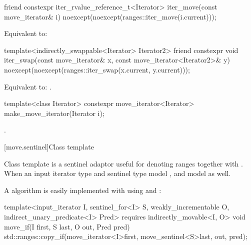 %
\begin{itemdecl}
friend constexpr iter_rvalue_reference_t<Iterator>
  iter_move(const move_iterator& i)
    noexcept(noexcept(ranges::iter_move(i.current)));
\end{itemdecl}

\begin{itemdescr}
\pnum
\effects
Equivalent to: 
\end{itemdescr}

%
\begin{itemdecl}
template<indirectly_swappable<Iterator> Iterator2>
  friend constexpr void
    iter_swap(const move_iterator& x, const move_iterator<Iterator2>& y)
      noexcept(noexcept(ranges::iter_swap(x.current, y.current)));
\end{itemdecl}

\begin{itemdescr}
\pnum
\effects
Equivalent to: .
\end{itemdescr}

%
\begin{itemdecl}
template<class Iterator>
constexpr move_iterator<Iterator> make_move_iterator(Iterator i);
\end{itemdecl}

\begin{itemdescr}
\pnum
\returns
{}.
\end{itemdescr}

[move.sentinel]{Class template }

\pnum
Class template  is a sentinel adaptor useful for denoting
ranges together with . When an input iterator type
 and sentinel type  model ,
 and  model
 as well.

\pnum
\begin{example}
A  algorithm is easily implemented with
 using  and :

\begin{codeblock}
template<input_iterator I, sentinel_for<I> S, weakly_incrementable O,
         indirect_unary_predicate<I> Pred>
  requires indirectly_movable<I, O>
void move_if(I first, S last, O out, Pred pred) {
  std::ranges::copy_if(move_iterator<I>{first}, move_sentinel<S>{last}, out, pred);
}
\end{codeblock}
\end{example}

